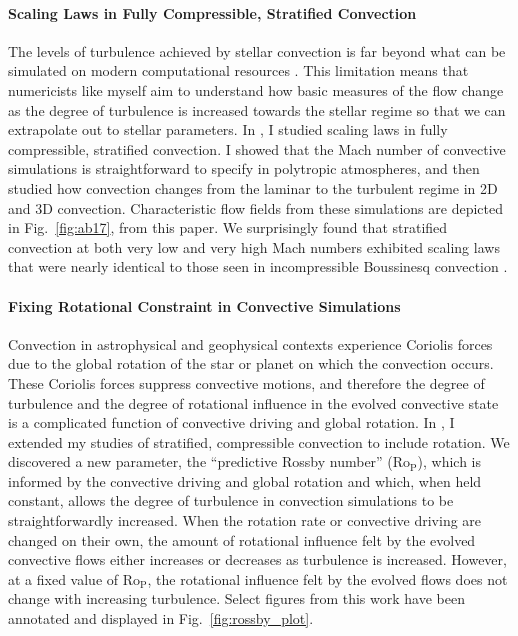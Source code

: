 \documentclass[preprint, hmargin=1in, vmargin=1in]{aastex62}
\begin{document}
\paragraph{Scaling Laws in Fully Compressible, Stratified Convection}
The levels of turbulence achieved by stellar convection is far beyond what can be simulated on modern computational resources \citep[see e.g.,][for a discussion]{brummell&all2002}.
This limitation means that numericists like myself aim to understand how basic measures of the flow change as the degree of turbulence is increased towards the stellar regime so that we can extrapolate out to stellar parameters.
In \citet{anders&brown2017}, I studied scaling laws in fully compressible, stratified convection.
I showed that the Mach number of convective simulations is straightforward to specify in polytropic atmospheres, and then studied how convection changes from the laminar to the turbulent regime in 2D and 3D convection.
Characteristic flow fields from these simulations are depicted in Fig.~\ref{fig:ab17}, from this paper.
We surprisingly found that stratified convection at both very low and very high Mach numbers exhibited scaling laws that were nearly identical to those seen in incompressible Boussinesq convection \citep{ahlers&all2009}.

\vspace{-4pt}
\paragraph{Fixing Rotational Constraint in Convective Simulations}
Convection in astrophysical and geophysical contexts experience Coriolis forces due to the global rotation of the star or planet on which the convection occurs.
These Coriolis forces suppress convective motions, and therefore the degree of turbulence and the degree of rotational influence in the evolved convective state is a complicated function of convective driving and global rotation.
In \citet{anders&all2019}, I extended my studies of stratified, compressible convection to include rotation.
We discovered a new parameter, the ``predictive Rossby number'' (Ro$_\text{P}$), which is informed by the convective driving and global rotation and which, when held constant, allows the degree of turbulence in convection simulations to be straightforwardly increased.
When the rotation rate or convective driving are changed on their own, the amount of rotational influence felt by the evolved convective flows either increases or decreases as turbulence is increased.
However, at a fixed value of Ro$_\text{P}$, the rotational influence felt by the evolved flows does not change with increasing turbulence.
Select figures from this work have been annotated and displayed in Fig.~\ref{fig:rossby_plot}.
\end{document}
